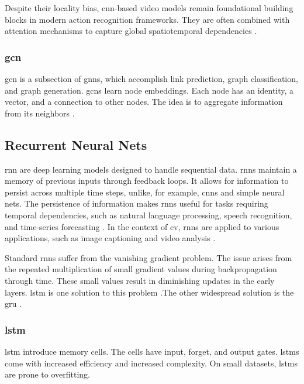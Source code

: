 Despite their locality bias, \acrshort{cnn}-based video models remain foundational building blocks in modern action recognition frameworks. They are often combined with attention mechanisms to capture global spatiotemporal dependencies \cite{fu_look_2017}.

\subsubsection{\acrfull{gcn}}

\acrfull{gcn} is a subsection of \acrfull{gnn}s, which accomplish link prediction, graph classification, and graph generation. \acrshort{gcn}s learn node embeddings. Each node has an identity, a vector, and a connection to other nodes. The idea is to aggregate information from its neighbors \cite{kipf_gcn_2017}.

\subsection{Recurrent Neural Nets}

\acrfull{rnn} are deep learning models designed to handle sequential data. \acrshort{rnn}s maintain a memory of previous inputs through feedback loops. It allows for information to persist across multiple time steps, unlike, for example, \acrshort{cnn}s and simple neural nets. The persistence of information makes \acrshort{rnn}s useful for tasks requiring temporal dependencies, such as natural language processing, speech recognition, and time-series forecasting \cite{ibm_rnn_2025}. In the context of \acrfull{cv}, \acrshort{rnn}s are applied to various applications, such as image captioning and video analysis \cite{agyeman_soccer_2019}. 

Standard \acrshort{rnn}s suffer from the vanishing gradient problem. The issue arises from the repeated multiplication of small gradient values during backpropagation through time. These small values result in diminishing updates in the early layers. \acrfull{lstm} is one solution to this problem \cite{bhogal_human_2023, kumar_human_2023, mahaseni_spotting_2021}.The other widespread solution is the \acrfull{gru} \cite{giveki_human_2024,li_oarnet_2024,yu_i3d_2023}. 

\subsubsection{\acrfull{lstm}}
\acrlong{lstm} introduce memory cells. The cells have input, forget, and output gates. \acrshort{lstm}s come with increased efficiency and increased complexity. On small datasets, \acrshort{lstm}s are prone to overfitting. 

